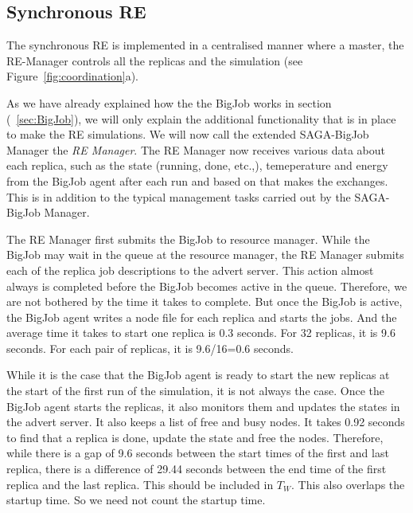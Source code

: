 \documentclass{rspublic}
\begin{document}
\subsection{Synchronous RE}

The synchronous RE is implemented in a centralised manner where a
master, the RE-Manager controls all the replicas and the simulation
(see Figure~\ref{fig:coordination}a). 

As we have already explained how the the BigJob works in section (~\ref{sec:BigJob}), we will only explain the additional functionality that is in place to make the RE simulations. We will now call the extended SAGA-BigJob Manager the \emph{RE Manager}. The RE Manager now receives various data about each replica, such as the state (running, done, etc.,), temeperature and energy from the BigJob agent after each run and based on that makes the exchanges. This is in addition to the typical management tasks carried out by the SAGA-BigJob Manager.

The RE Manager first submits the BigJob to resource manager. While the BigJob may wait in the queue at the resource manager, the RE Manager submits each of the replica job descriptions to the advert server. This action almost always is completed before the BigJob becomes active in the queue. Therefore, we are not bothered by the time it takes to complete. But once the BigJob is active, the BigJob agent writes a node file for each replica and starts the jobs. And the average time it takes to start one replica is 0.3 seconds. For 32 replicas, it is 9.6 seconds. For each pair of replicas, it is 9.6/16=0.6 seconds.

While it is the case that the BigJob agent is ready to start the new replicas at the start of the first run of the simulation, it is not always the case. Once the BigJob agent starts the replicas, it also monitors them and updates the states in the advert server.   It also keeps a list of free and busy nodes. It takes 0.92 seconds to find that a replica is done, update the state and free the nodes. Therefore, while there is a gap of 9.6 seconds between the start times of the first and last replica, there is a difference of 29.44 seconds between the end time of the first replica and the last replica. This should be included in $T_W$. This also overlaps the startup time. So we need not count the startup time.
\end{document}

